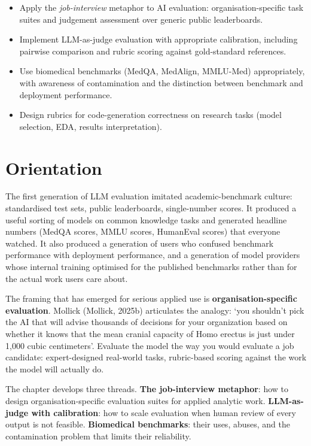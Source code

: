 \documentclass[
  letterpaper,
  11pt]{scrbook}
\providecommand{\tightlist}{%
  \setlength{\itemsep}{0pt}\setlength{\parskip}{0pt}}
\begin{document}
\begin{itemize}
\tightlist
\item
  Apply the \emph{job-interview} metaphor to AI evaluation:
  organisation-specific task suites and judgement assessment over
  generic public leaderboards.
\item
  Implement LLM-as-judge evaluation with appropriate calibration,
  including pairwise comparison and rubric scoring against gold-standard
  references.
\item
  Use biomedical benchmarks (MedQA, MedAlign, MMLU-Med) appropriately,
  with awareness of contamination and the distinction between benchmark
  and deployment performance.
\item
  Design rubrics for code-generation correctness on research tasks
  (model selection, EDA, results interpretation).
\end{itemize}

\section{Orientation}\label{orientation-9}

The first generation of LLM evaluation imitated academic-benchmark
culture: standardised test sets, public leaderboards, single-number
scores. It produced a useful sorting of models on common knowledge tasks
and generated headline numbers (MedQA scores, MMLU scores, HumanEval
scores) that everyone watched. It also produced a generation of users
who confused benchmark performance with deployment performance, and a
generation of model providers whose internal training optimised for the
published benchmarks rather than for the actual work users care about.

The framing that has emerged for serious applied use is
\textbf{organisation-specific evaluation}. Mollick (Mollick, 2025b)
articulates the analogy: `you shouldn't pick the AI that will advise
thousands of decisions for your organization based on whether it knows
that the mean cranial capacity of Homo erectus is just under 1,000 cubic
centimeters'. Evaluate the model the way you would evaluate a job
candidate: expert-designed real-world tasks, rubric-based scoring
against the work the model will actually do.

The chapter develops three threads. \textbf{The job-interview metaphor}:
how to design organisation-specific evaluation suites for applied
analytic work. \textbf{LLM-as- judge with calibration}: how to scale
evaluation when human review of every output is not feasible.
\textbf{Biomedical benchmarks}: their uses, abuses, and the
contamination problem that limits their reliability.
\end{document}

